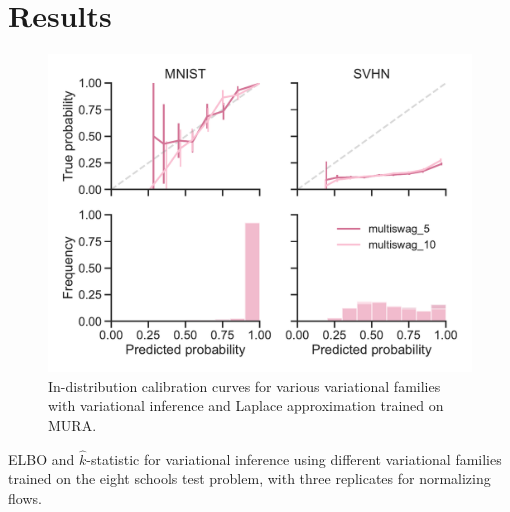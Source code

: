 \chapter{Results}

\begin{figure}
    \centering
    \includegraphics[width=0.7\linewidth]{figures/MnistMultiSwag.pdf}
    \caption{In-distribution calibration curves for various variational families with variational inference and Laplace approximation trained on MURA.}
    \label{fig:mura-cc-vi}
\end{figure}

\begin{table}
    \centering
    \caption[ELBO and $\hat{k}$-statistic for variational inference]{ELBO and $\hat{k}$-statistic for variational inference using different variational families trained on the eight schools test problem, with three replicates for normalizing flows.}
    \label{tab:poi}
    
\end{table}
